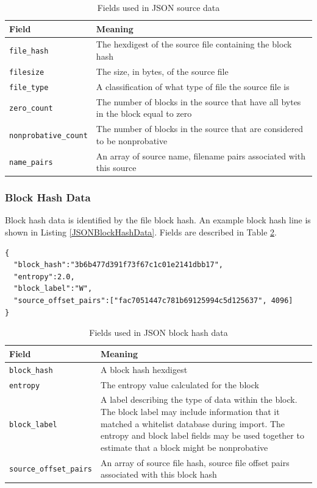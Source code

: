 \documentclass[11pt,fleqn]{article} %
\begin{document}
\begin{table}[!ht]

\centering
\caption{Fields used in JSON source data}
\label{tab:JSONSourceData}
\begin{tabular}{|p{5 cm}|p{8.8 cm}|}
\hline \hline
\textbf{Field} & \textbf{Meaning} \\
\hline
\verb+file_hash+ & The hexdigest of the source file containing the block hash\\
\hline
\verb+filesize+ & The size, in bytes, of the source file\\
\hline
\verb+file_type+ & A classification of what type of file the source file is\\
\hline
\verb+zero_count+ & The number of blocks in the source that have all bytes in the block equal to zero\\
\hline
\verb+nonprobative_count+ & The number of blocks in the source that are considered to be nonprobative\\
\hline
\verb+name_pairs+ & An array of source name, filename pairs associated with this source\\
\hline
\end{tabular}
\end{table}

\subsubsection{Block Hash Data}
Block hash data is identified by the file block hash.  An example block hash line is shown in Listing \ref{JSONBlockHashData}. Fields are described in Table \ref{tab:JSONBlockHashData}.\\

\lstset{style=customfile}
\begin{lstlisting}[float, caption={Example JSON block hash data used during import/export}, label=JSONBlockHashData]
{
  "block_hash":"3b6b477d391f73f67c1c01e2141dbb17",
  "entropy":2.0,
  "block_label":"W",
  "source_offset_pairs":["fac7051447c781b69125994c5d125637", 4096]
}
\end{lstlisting}

\begin{table}[!ht]

\centering
\caption{Fields used in JSON block hash data}
\label{tab:JSONBlockHashData}
\begin{tabular}{|p{5 cm}|p{8.8 cm}|}
\hline \hline
\textbf{Field} & \textbf{Meaning} \\
\hline
\verb+block_hash+ & A block hash hexdigest\\
\hline
\verb+entropy+ & The entropy value calculated for the block\\
\hline
\verb+block_label+ & A label describing the type of data within the block. The block label may include information that it matched a whitelist database during import. The entropy and block label fields may be used together to estimate that a block might be nonprobative\\
\hline
\verb+source_offset_pairs+ & An array of source file hash, source file offset pairs associated with this block hash\\
\hline
\end{tabular}
\end{table}
\end{document}
